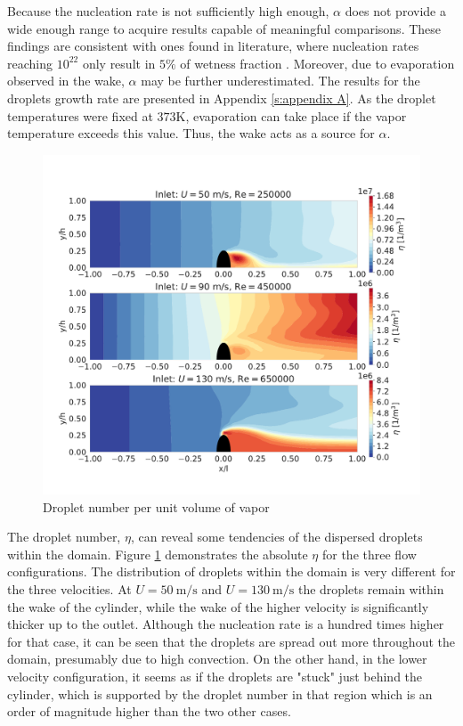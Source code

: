 \documentclass[12pt]{article}
\numberwithin{equation}{section}
\begin{document}
Because the nucleation rate is not sufficiently high enough, $\alpha$ does not provide a wide enough range to acquire results capable of meaningful comparisons. These findings are consistent with ones found in literature, where nucleation rates reaching $10^{22}$ only result in $5\%$ of wetness fraction \cite{patel2016influence}. Moreover, due to evaporation observed in the wake, $\alpha$ may be further underestimated. The results for the droplets growth rate are presented in Appendix \ref{s:appendix A}. As the droplet temperatures were fixed at $373\mathrm{K}$, evaporation can take place if the vapor temperature exceeds this value. Thus, the wake acts as a source for $\alpha$. 
\begin{figure}[H]
    \centering
    \includegraphics[trim={0 40 0 50},clip,width=1.0\textwidth]{Figures/N_plot_speed_compare.pdf}
    \caption{Droplet number per unit volume of vapor}
    \label{f:cylinder_dropletnum}
\end{figure}
The droplet number, $\eta$, can reveal some tendencies of the dispersed droplets within the domain. Figure \ref{f:cylinder_dropletnum} demonstrates the absolute $\eta$ for the three flow configurations. The distribution of droplets within the domain is very different for the three velocities. At $U=50\:\mathrm{m/s}$ and $U=130\:\mathrm{m/s}$ the droplets remain within the wake of the cylinder, while the wake of the higher velocity is significantly thicker up to the outlet. Although the nucleation rate is a hundred times higher for that case, it can be seen that the droplets are spread out more throughout the domain, presumably due to high convection. On the other hand, in the lower velocity configuration, it seems as if the droplets are "stuck" just behind the cylinder, which is supported by the droplet number in that region which is an order of magnitude higher than the two other cases. 
\end{document}
